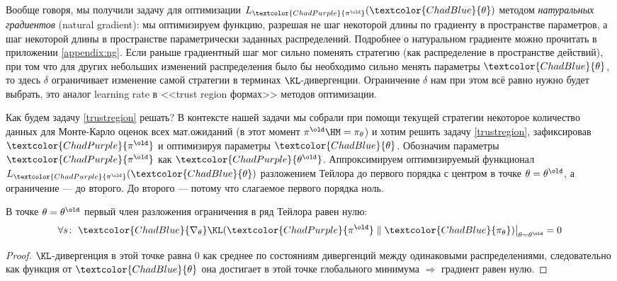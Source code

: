 Вообще говоря, мы получили задачу для оптимизации $L_{\textcolor{ChadPurple}{\pi^{\old}}}(\textcolor{ChadBlue}{\theta})$ методом \emph{натуральных градиентов} (natural gradient): мы оптимизируем функцию, разрешая не шаг некоторой длины по градиенту в пространстве параметров, а шаг некоторой длины в пространстве параметрически заданных распределений. Подробнее о натуральном градиенте можно прочитать в приложении \ref{appendix:ng}. Если раньше градиентный шаг мог сильно поменять стратегию (как распределение в пространстве действий), при том что для других небольших изменений распределения было бы необходимо сильно менять параметры $\textcolor{ChadBlue}{\theta}$, то здесь $\delta$ ограничивает изменение самой стратегии в терминах $\KL$-дивергенции. Ограничение $\delta$ нам при этом всё равно нужно будет выбрать, это аналог learning rate в <<trust region формах>> методов оптимизации.

Как будем задачу \eqref{trustregion} решать? В контексте нашей задачи мы собрали при помощи текущей стратегии некоторое количество данных для Монте-Карло оценок всех мат.ожиданий (в этот момент $\pi^{\old} \HM= \pi_\theta$) и хотим решить задачу \eqref{trustregion}, зафиксировав $\textcolor{ChadPurple}{\pi^{\old}}$ и оптимизируя параметры $\textcolor{ChadBlue}{\theta}$. Обозначим параметры $\textcolor{ChadPurple}{\pi^{\old}}$ как $\textcolor{ChadPurple}{\theta^{\old}}$. Аппроксимируем оптимизируемый функционал $L_{\textcolor{ChadPurple}{\pi^{\old}}}(\textcolor{ChadBlue}{\theta})$ разложением Тейлора до первого порядка с центром в точке $\theta = \theta^{\old}$, а ограничение --- до второго. До второго --- потому что слагаемое первого порядка ноль.

\begin{proposition}
В точке $\theta = \theta^{\old}$ первый член разложения ограничения в ряд Тейлора равен нулю:
\begin{equation*}
\forall s \colon \left. \textcolor{ChadBlue}{\nabla_\theta} \KL(\textcolor{ChadPurple}{\pi^{\old}} \parallel \textcolor{ChadBlue}{\pi_\theta}) \right|_{\theta = \theta^{\old}} = 0
\end{equation*}
\begin{proof}
$\KL$-дивергенция в этой точке равна 0 как среднее по состояниям дивергенций между одинаковыми распределениями, следовательно как функция от $\textcolor{ChadBlue}{\theta}$ она достигает в этой точке глобального минимума $\Rightarrow$ градиент равен нулю.
\end{proof}
\end{proposition}

